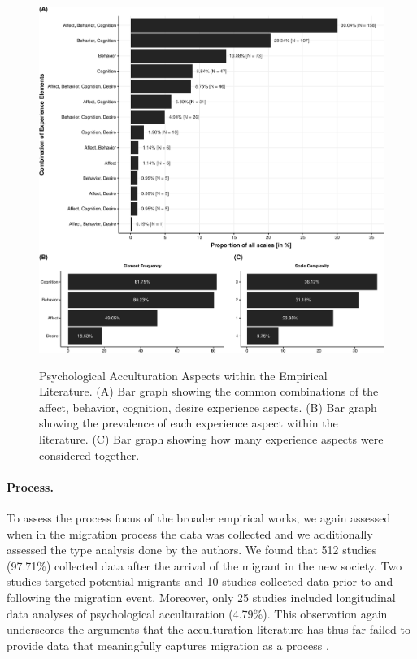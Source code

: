 \begin{figure}[h]
\centering
\caption{Psychological Acculturation Aspects within the Empirical Literature. (A) Bar graph showing the common combinations of the affect, behavior, cognition, desire experience aspects. (B) Bar graph showing the prevalence of each experience aspect within the literature. (C) Bar graph showing how many experience aspects were considered together.}
\includegraphics[width=\textwidth]{Figures/EmpPlotFreq-1}
\label{fig:EmpPlotFreq-1}
\end{figure}

\paragraph{Process.}

To assess the process focus of the broader empirical works, we again
assessed when in the migration process the data was collected and we
additionally assessed the type analysis done by the authors. We found
that 512 studies (97.71\%) collected data after the arrival of the
migrant in the new society. Two studies targeted potential migrants and
10 studies collected data prior to and following the migration event.
Moreover, only 25 studies included longitudinal data analyses of
psychological acculturation (4.79\%). This observation again underscores
the arguments that the acculturation literature has thus far failed to
provide data that meaningfully captures migration as a process
\citep[e.g.,][]{Brown2011, Ward2019}.

